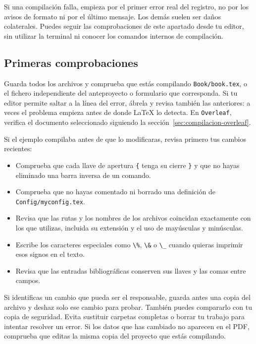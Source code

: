Si una compilación falla, empieza por el primer error real del registro, no por los avisos de formato ni por el último mensaje. Los demás suelen ser daños colaterales. Puedes seguir las comprobaciones de este apartado desde tu editor, sin utilizar la terminal ni conocer los comandos internos de compilación.

\subsection{Primeras comprobaciones}

Guarda todos los archivos y comprueba que estás compilando \texttt{Book/book.tex}, o el fichero independiente del anteproyecto o formulario que corresponda. Si tu editor permite saltar a la línea del error, ábrela y revisa también las anteriores: a veces el problema empieza antes de donde \LaTeX{} lo detecta. En \texttt{Overleaf}, verifica el documento seleccionado siguiendo la sección~\ref{sec:compilacion-overleaf}.

Si el ejemplo compilaba antes de que lo modificaras, revisa primero tus cambios recientes:

\begin{itemize}
  \item Comprueba que cada llave de apertura \texttt{\{} tenga su cierre \texttt{\}} y que no hayas eliminado una barra inversa de un comando.
  \item Comprueba que no hayas comentado ni borrado una definición de \texttt{Config/myconfig.tex}.
  \item Revisa que las rutas y los nombres de los archivos coincidan exactamente con los que utilizas, incluida su extensión y el uso de mayúsculas y minúsculas.
  \item Escribe los caracteres especiales como \texttt{\textbackslash{}\%}, \texttt{\textbackslash{}\&} o \texttt{\textbackslash{}\_} cuando quieras imprimir esos signos en el texto.
  \item Revisa que las entradas bibliográficas conserven sus llaves y las comas entre campos.
\end{itemize}

Si identificas un cambio que pueda ser el responsable, guarda antes una copia del archivo y deshaz solo ese cambio para probar. También puedes compararlo con tu copia de seguridad. Evita sustituir carpetas completas o borrar tu trabajo para intentar resolver un error. Si los datos que has cambiado no aparecen en el PDF, comprueba que editas la misma copia del proyecto que estás compilando.

